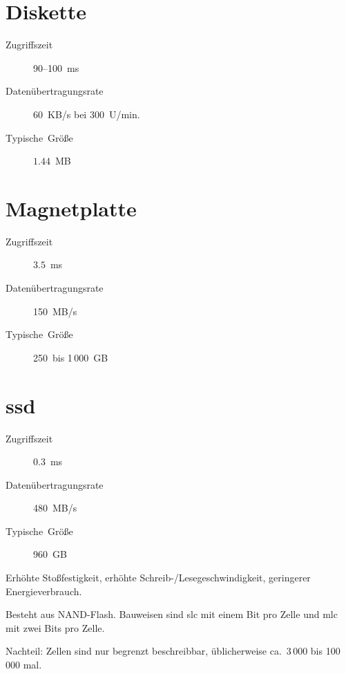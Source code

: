 \section{Diskette}
\begin{description}
  \item [{Zugriffszeit}] 90--100~ms
  \item [{Datenübertragungsrate}] 60~KB/s bei 300~U/min.
  \item [{Typische~Größe}] $1.44$~MB
\end{description}

\section{Magnetplatte}
\begin{description}
  \item [{Zugriffszeit}] $3.5$~ms
  \item [{Datenübertragungsrate}] 150~MB/s
  \item [{Typische~Größe}] 250~bis 1\,000~GB
\end{description}

\section[SSD]{\gls{ssd}}
\begin{description}
  \item [{Zugriffszeit}] 
	$0.3$~ms
  \item [{Datenübertragungsrate}] 480~MB/s
  \item [{Typische~Größe}] 960~GB
\end{description}
Erhöhte Stoßfestigkeit, erhöhte Schreib-/Lesegeschwindigkeit, geringerer Energieverbrauch.

Besteht aus NAND-Flash. Bauweisen sind \gls{slc} mit einem Bit pro Zelle und \gls{mlc} mit zwei Bits pro Zelle.

Nachteil: Zellen sind nur begrenzt beschreibbar, üblicherweise ca.~3\,000 bis 100\,000 mal.

